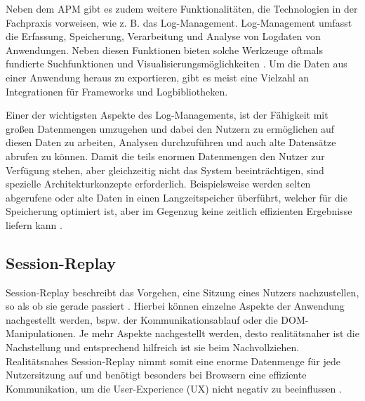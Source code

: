 Neben dem APM gibt es zudem weitere Funktionalitäten, die Technologien in der Fachpraxis vorweisen, wie z. B. das Log-Management. Log-Management umfasst die Erfassung, Speicherung, Verarbeitung und Analyse von Logdaten von Anwendungen. Neben diesen Funktionen bieten solche Werkzeuge oftmals fundierte Suchfunktionen und Visualisierungsmöglichkeiten \cite{DesignLogManagementSystem}. Um die Daten aus einer Anwendung heraus zu exportieren, gibt es meist eine Vielzahl an Integrationen für Frameworks und Logbibliotheken.

Einer der wichtigsten Aspekte des Log-Managements, ist der Fähigkeit mit großen Datenmengen umzugehen und dabei den Nutzern zu ermöglichen auf diesen Daten zu arbeiten, Analysen durchzuführen und auch alte Datensätze abrufen zu können\cite{LoggingAndLogManagement}. Damit die teils enormen Datenmengen den Nutzer zur Verfügung stehen, aber gleichzeitig nicht das System beeinträchtigen, sind spezielle Architekturkonzepte erforderlich. Beispielsweise werden selten abgerufene oder alte Daten in einen Langzeitspeicher überführt, welcher für die Speicherung optimiert ist, aber im Gegenzug keine zeitlich effizienten Ergebnisse liefern kann \cite{LoggingAndLogManagement}.

\subsection{Session-Replay}

Session-Replay beschreibt das Vorgehen, eine Sitzung eines Nutzers nachzustellen, so als ob sie gerade passiert \cite{NoBoundariesExfiltrationBySessionReplayScripts}. Hierbei können einzelne Aspekte der Anwendung nachgestellt werden, bspw. der Kommunikationsablauf oder die DOM-Manipulationen. Je mehr Aspekte nachgestellt werden, desto realitätsnaher ist die Nachstellung und entsprechend hilfreich ist sie beim Nachvollziehen. Realitätsnahes Session-Replay nimmt somit eine enorme Datenmenge für jede Nutzersitzung auf und benötigt besonders bei Browsern eine effiziente Kommunikation, um die User-Experience (UX) nicht negativ zu beeinflussen \cite{AdvancedWebAnalyticsToolForMouseTracking} \cite{LogRocketPerformance}.

